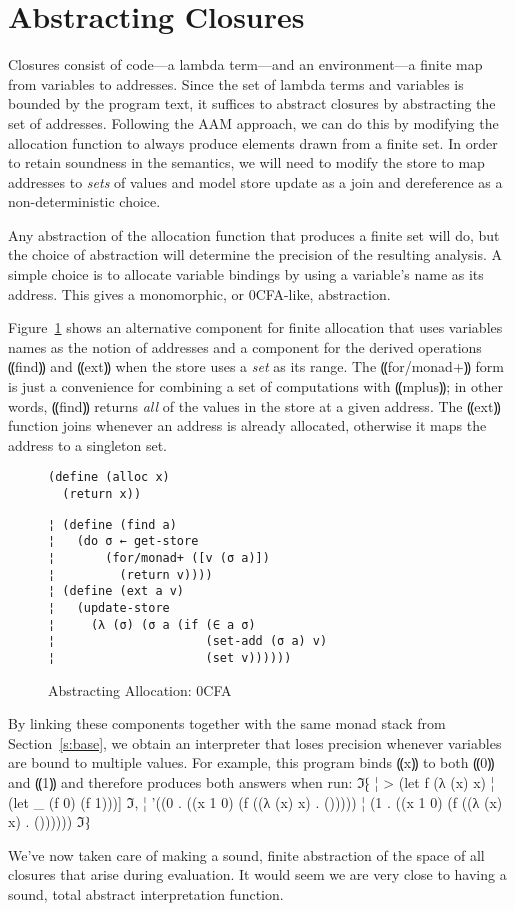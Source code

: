 \section{Abstracting Closures}\label{s:closures}

Closures consist of code---a lambda term---and an environment---a finite map
from variables to addresses.  Since the set of lambda terms and variables is
bounded by the program text, it suffices to abstract closures by abstracting
the set of addresses.  Following the AAM approach, we can do this by modifying
the allocation function to always produce elements drawn from a finite set.  In
order to retain soundness in the semantics, we will need to modify the store to
map addresses to \emph{sets} of values and model store update as a join and
dereference as a non-deterministic choice.

Any abstraction of the allocation function that produces a finite set will do,
but the choice of abstraction will determine the precision of the resulting
analysis.  A simple choice is to allocate variable bindings by using a
variable's name as its address.  This gives a monomorphic, or 0CFA-like,
abstraction.

Figure~\ref{f:0cfa-abs} shows an alternative component for finite
allocation that uses variables names as the notion of addresses and a
component for the derived operations ⸨find⸩ and ⸨ext⸩
when the store uses a \emph{set} as its range.  The
⸨for/monad+⸩ form is just a convenience for combining a set of
computations with ⸨mplus⸩; in other words, ⸨find⸩
returns \emph{all} of the values in the store at a given address.  The
⸨ext⸩ function joins whenever an address is already allocated,
otherwise it maps the address to a singleton set.

\begin{figure}
\begin{lstlisting}
(define (alloc x)
  (return x))
\end{lstlisting}
\figskip{}
\begin{lstlisting}
¦ (define (find a)
¦   (do σ ← get-store
¦       (for/monad+ ([v (σ a)])
¦         (return v))))
¦ (define (ext a v)
¦   (update-store
¦     (λ (σ) (σ a (if (∈ a σ) 
¦                     (set-add (σ a) v) 
¦                     (set v))))))
\end{lstlisting}
\caption{Abstracting Allocation: 0CFA}
\label{f:0cfa-abs}
\end{figure}

By linking these components together with the same monad stack from
Section~\ref{s:base}, we obtain an interpreter that loses precision whenever
variables are bound to multiple values.  For example, this program
binds ⸨x⸩ to both ⸨0⸩ and ⸨1⸩ and therefore
produces both answers when run:
ℑ⁅
¦ > (let f (λ (x) x)
¦     (let _ (f 0) (f 1)))]
ℑ,
¦ '((0 . ((x 1 0) (f ((λ (x) x) . ()))))
¦   (1 . ((x 1 0) (f ((λ (x) x) . ())))))
ℑ⁆

We've now taken care of making a sound, finite abstraction of the
space of all closures that arise during evaluation.  It would seem we
are very close to having a sound, total abstract interpretation
function.

